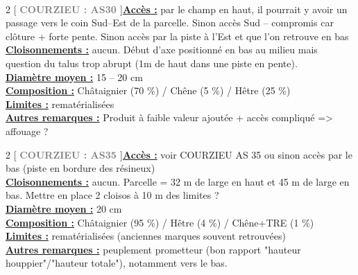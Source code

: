 \documentclass[a4paper,openany]{book}\usepackage[]{graphicx}\usepackage[]{color}
\begin{document}
\\\begin{multicols}{2}
[
\textbf{\textcolor{gray}{
\large COURZIEU : AS30
}}
]\noindent\textbf{\underline{Accès :}} par le champ en haut, il pourrait y avoir un passage vers le coin Sud--Est de la parcelle. Sinon accès Sud --  compromis car clôture + forte pente. Sinon accès par la piste à l'Est et que l'on retrouve en bas\vspace{0.1cm} \\\noindent\textbf{\underline{Cloisonnements :}} aucun. Début d'axe positionné en bas au milieu mais question du talus trop abrupt (1m de haut dans une piste en pente).\vspace{0.1cm} \\\noindent\textbf{\underline{Diamètre moyen :}} 15 -- 20 cm\vspace{0.1cm} \\\noindent\textbf{\underline{Composition :}} Châtaignier (70 \%) / Chêne (5 \%) / Hêtre (25 \%)\vspace{0.1cm} \\\noindent\textbf{\underline{Limites :}} rematérialisées\vspace{0.1cm} \\\noindent\textbf{\underline{Autres remarques :}} Produit à faible valeur ajoutée + accès compliqué => affouage ?\vspace{0.1cm} \\\end{multicols}\begin{multicols}{2}
[
\textbf{\textcolor{gray}{
\large COURZIEU : AS35
}}
]\noindent\textbf{\underline{Accès :}} voir COURZIEU AS 35 ou sinon accès par le bas (piste en bordure des résineux)\vspace{0.1cm} \\\noindent\textbf{\underline{Cloisonnements :}} aucun. Parcelle = 32 m de large en haut et 45 m de large en bas. Mettre en place 2 cloisos à 10 m des limites ?\vspace{0.1cm} \\\noindent\textbf{\underline{Diamètre moyen :}} 20 cm\vspace{0.1cm} \\\noindent\textbf{\underline{Composition :}} Châtaignier (95 \%) / Hêtre (4 \%) / Chêne+TRE (1 \%)\vspace{0.1cm} \\\noindent\textbf{\underline{Limites :}} rematérialisées (anciennes marques souvent retrouvées)\vspace{0.1cm} \\\noindent\textbf{\underline{Autres remarques :}} peuplement prometteur (bon rapport "hauteur houppier"/"hauteur totale"), notamment vers le bas.\vspace{0.1cm} \\\end{multicols}\begin{center}

\end{center}
\end{document}
